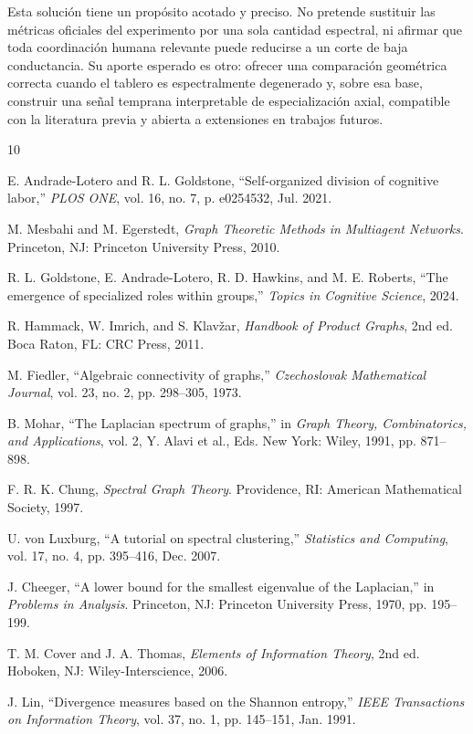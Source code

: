 \documentclass[journal]{IEEEtran}
\begin{document}
Esta solución tiene un propósito acotado y preciso. No pretende sustituir las métricas oficiales del experimento por una sola cantidad espectral, ni afirmar que toda coordinación humana relevante puede reducirse a un corte de baja conductancia. Su aporte esperado es otro: ofrecer una comparación geométrica correcta cuando el tablero es espectralmente degenerado y, sobre esa base, construir una señal temprana interpretable de especialización axial, compatible con la literatura previa y abierta a extensiones en trabajos futuros.


\begin{thebibliography}{10}

E. Andrade-Lotero and R. L. Goldstone, ``Self-organized division of cognitive labor,'' \textit{PLOS ONE}, vol. 16, no. 7, p. e0254532, Jul. 2021.

M. Mesbahi and M. Egerstedt, \textit{Graph Theoretic Methods in Multiagent Networks}. Princeton, NJ: Princeton University Press, 2010.

R. L. Goldstone, E. Andrade-Lotero, R. D. Hawkins, and M. E. Roberts, ``The emergence of specialized roles within groups,'' \textit{Topics in Cognitive Science}, 2024.

R. Hammack, W. Imrich, and S. Klav\v{z}ar, \textit{Handbook of Product Graphs}, 2nd ed. Boca Raton, FL: CRC Press, 2011.

M. Fiedler, ``Algebraic connectivity of graphs,'' \textit{Czechoslovak Mathematical Journal}, vol. 23, no. 2, pp. 298--305, 1973.

B. Mohar, ``The Laplacian spectrum of graphs,'' in \textit{Graph Theory, Combinatorics, and Applications}, vol. 2, Y. Alavi et al., Eds. New York: Wiley, 1991, pp. 871--898.

F. R. K. Chung, \textit{Spectral Graph Theory}. Providence, RI: American Mathematical Society, 1997.

U. von Luxburg, ``A tutorial on spectral clustering,'' \textit{Statistics and Computing}, vol. 17, no. 4, pp. 395--416, Dec. 2007.

J. Cheeger, ``A lower bound for the smallest eigenvalue of the Laplacian,'' in \textit{Problems in Analysis}. Princeton, NJ: Princeton University Press, 1970, pp. 195--199.

T. M. Cover and J. A. Thomas, \textit{Elements of Information Theory}, 2nd ed. Hoboken, NJ: Wiley-Interscience, 2006.

J. Lin, ``Divergence measures based on the Shannon entropy,'' \textit{IEEE Transactions on Information Theory}, vol. 37, no. 1, pp. 145--151, Jan. 1991.

\end{thebibliography}
\end{document}
